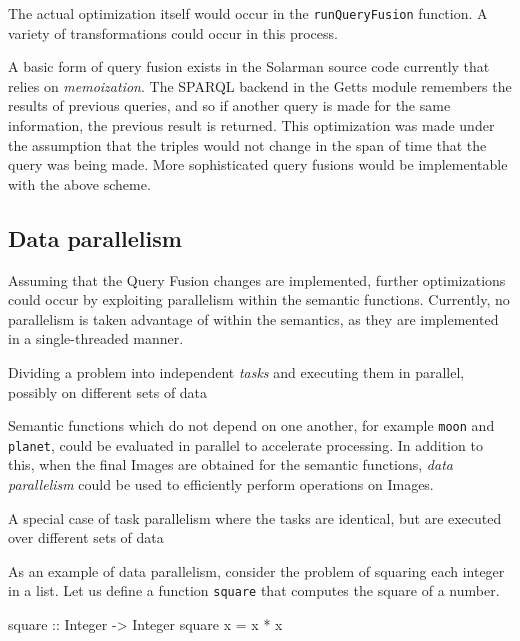 \documentclass[../main.tex]{subfiles}
\begin{document}
The actual optimization itself would occur in the \texttt{runQueryFusion} function.  A variety of transformations could occur in this process.

A basic form of query fusion exists in the Solarman source code currently that relies on {\em memoization}.  The SPARQL backend in the Getts module remembers the
results of previous queries, and so if another query is made for the same information, the previous result is returned.  This optimization was made
under the assumption that the triples would not change in the span of time that the query was being made.  More sophisticated query fusions
would be implementable with the above scheme.

\subsection{Data parallelism}

Assuming that the Query Fusion changes are implemented, further optimizations could occur by exploiting parallelism within the semantic functions.
Currently, no parallelism is taken advantage of within the semantics, as they are implemented in a single-threaded manner.

\begin{definition}
	Dividing a problem into independent {\em tasks} and executing them in parallel, possibly on different sets of data
\end{definition}

Semantic functions which do not depend on one another, for example \texttt{moon} and \texttt{planet}, could be evaluated in parallel to accelerate processing.
In addition to this, when the final Images are obtained for the semantic functions, {\em data parallelism} could be used to efficiently perform operations
on Images.

\begin{definition}
	A special case of task parallelism where the tasks are identical, but are executed over different sets of data
\end{definition}

As an example of data parallelism, consider the problem of squaring each integer in a list. Let us define a function \texttt{square} that computes the square of a number.

\begin{code}
	square :: Integer -> Integer
	square x = x * x
\end{code}
\end{document}
